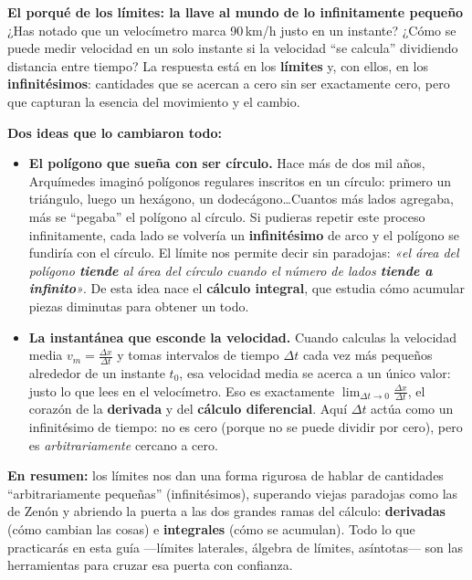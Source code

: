 \documentclass[12pt, a4paper]{article}
\begin{document}
\vspace{8pt}
\begin{cuadroextra}
  \textbf{El porqué de los límites: la llave al mundo de lo infinitamente pequeño}\\[4pt]
  ¿Has notado que un velocímetro marca 90\,km/h justo en un instante? ¿Cómo se puede medir velocidad en un solo instante si la velocidad ``se calcula'' dividiendo distancia entre tiempo? La respuesta está en los \textbf{límites} y, con ellos, en los \textbf{infinitésimos}: cantidades que se acercan a cero sin ser exactamente cero, pero que capturan la esencia del movimiento y el cambio.

  \textbf{Dos ideas que lo cambiaron todo:}
  \begin{itemize}[leftmargin=*]
    \item \textbf{El polígono que sueña con ser círculo.} Hace más de dos mil años, Arquímedes imaginó polígonos regulares inscritos en un círculo: primero un triángulo, luego un hexágono, un dodecágono\dots Cuantos más lados agregaba, más se ``pegaba'' el polígono al círculo. Si pudieras repetir este proceso infinitamente, cada lado se volvería un \textbf{infinitésimo} de arco y el polígono se fundiría con el círculo. El límite nos permite decir sin paradojas: \textit{«el área del polígono \textbf{tiende} al área del círculo cuando el número de lados \textbf{tiende a infinito}»}. De esta idea nace el \textbf{cálculo integral}, que estudia cómo acumular piezas diminutas para obtener un todo.
    \item \textbf{La instantánea que esconde la velocidad.} Cuando calculas la velocidad media $v_m = \frac{\Delta x}{\Delta t}$ y tomas intervalos de tiempo $\Delta t$ cada vez más pequeños alrededor de un instante $t_0$, esa velocidad media se acerca a un único valor: justo lo que lees en el velocímetro. Eso es exactamente $\lim_{\Delta t \to 0} \frac{\Delta x}{\Delta t}$, el corazón de la \textbf{derivada} y del \textbf{cálculo diferencial}. Aquí $\Delta t$ actúa como un infinitésimo de tiempo: no es cero (porque no se puede dividir por cero), pero es \textit{arbitrariamente} cercano a cero.
  \end{itemize}
  \textbf{En resumen:} los límites nos dan una forma rigurosa de hablar de cantidades ``arbitrariamente pequeñas'' (infinitésimos), superando viejas paradojas como las de Zenón y abriendo la puerta a las dos grandes ramas del cálculo: \textbf{derivadas} (cómo cambian las cosas) e \textbf{integrales} (cómo se acumulan). Todo lo que practicarás en esta guía ---límites laterales, álgebra de límites, asíntotas--- son las herramientas para cruzar esa puerta con confianza.
\end{cuadroextra}
\end{document}
